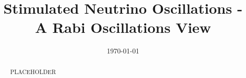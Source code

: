 \documentclass[%
preprint,
 amsmath,amssymb,
 aps,
]{revtex4-1}
\begin{document}

\title{Stimulated Neutrino Oscillations - A Rabi Oscillations View}%

\author{}




\date{\today}%

\begin{abstract}
PLACEHOLDER
\end{abstract}

\maketitle
\end{document}
